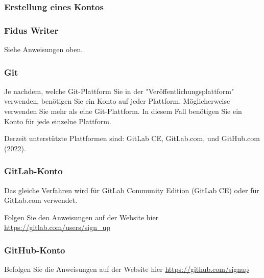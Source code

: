 \documentclass{article}
\begin{document}
\subsubsection{Erstellung eines Kontos}\label{H3028696}



\subsubsection{Fidus Writer}\label{H98190}



Siehe Anweisungen oben.


\subsubsection{Git}\label{H5911103}



Je nachdem, welche Git-Plattform Sie in der "Veröffentlichungsplattform" verwenden, benötigen Sie ein Konto auf jeder Plattform. Möglicherweise verwenden Sie mehr als eine Git-Plattform. In diesem Fall benötigen Sie ein Konto für jede einzelne Plattform.


Derzeit unterstützte Plattformen sind: GitLab CE, GitLab.com, und GitHub.com (2022).


\subsubsection{GitLab-Konto}\label{H7772100}



Das gleiche Verfahren wird für GitLab Community Edition (GitLab CE) oder für GitLab.com verwendet.


Folgen Sie den Anweisungen auf der Website hier \href{https://gitlab.com/users/sign_up}{https://gitlab.com/users/sign\_up}


\subsubsection{GitHub-Konto}\label{H8045385}



Befolgen Sie die Anweisungen auf der Website hier \href{https://github.com/signup}{https://github.com/signup}
\end{document}
